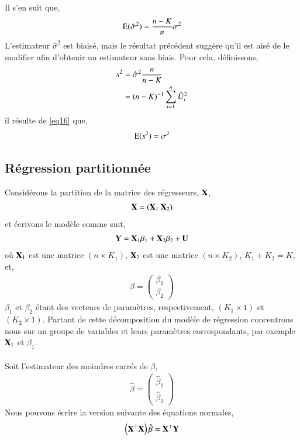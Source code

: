 \documentclass[10pt, reqno]{amsart}
\begin{document}
Il s'en suit que,
\begin{align}
\operatorname{E}(\hat{\sigma}^2) = \frac{n-K}{n}\sigma^2
\label{eq16}
\end{align}
L'estimateur $\hat{\sigma}^2$ est biaisé, mais le résultat précédent suggère qu'il est aisé de le modifier afin d'obtenir un estimateur sans biais. Pour cela, définissons,
\begin{align*}
s^2 &= \hat{\sigma}^2\frac{n}{n-K}\\
&=(n-K)^{-1}\sum_{i=1}^n \hat{U}_i^2
\end{align*}
il résulte de \eqref{eq16} que, 
\begin{align*}
\operatorname{E}(s^2) = \sigma^2
\end{align*}

\subsection{Régression partitionnée}
Considérons la partition de la matrice des régresseurs, $\mathbf X$,
\begin{align*}
\mathbf X = \left(\mathbf X_1 \  \mathbf X_2\right)
\end{align*}
et écrivons le modèle comme suit,
\begin{align*}
\mathbf Y = \mathbf X_1\beta_1 + \mathbf X_2\beta_2 + \mathbf U
\end{align*}
où $\mathbf X_1$ est une matrice $(n\times K_1)$, $\mathbf X_2$ est une matrice $(n\times K_2)$, $K_1+K_2 = K$, et,
\begin{align*}
\beta = \left(
\begin{array}{c}
\beta_1\\
\beta_2
\end{array}
\right)
\end{align*}
$\beta_1$ et $\beta_2$ étant des vecteurs de paramètres, respectivement, $(K_1\times 1)$ et $(K_2\times 1)$. Partant de cette décomposition du modèle de régression concentrons nous sur un groupe de variables et leurs paramètres correspondants, par exemple $\mathbf X_1$ et $\beta_1$.\\\\
 Soit l'estimateur des moindres carrés de $\beta$,
\begin{align*}
\hat{\beta} = \left(
\begin{array}{c}
\hat{\beta}_1\\
\hat{\beta}_2
\end{array}
\right)
\end{align*}
Nous pouvons écrire la version suivante des équations normales,
\begin{align*}
\left(\mathbf X^\top\mathbf X\right)\hat{\beta}=\mathbf X^\top\mathbf Y
\end{align*}
\end{document}
